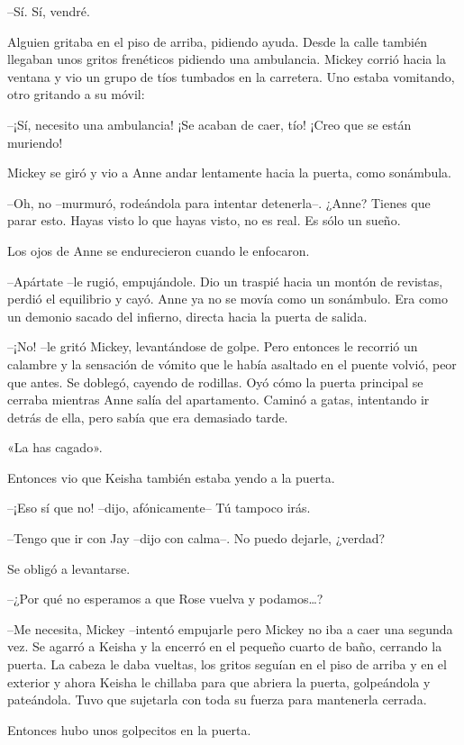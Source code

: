 {--Sí. Sí, vendré.}

{Alguien gritaba en el piso de arriba, pidiendo ayuda. Desde la calle
 también llegaban unos gritos frenéticos pidiendo una ambulancia. Mickey
 corrió hacia la ventana y vio un grupo de tíos tumbados en la carretera.
Uno estaba vomitando, otro gritando a su móvil:}

{--¡Sí, necesito una ambulancia! ¡Se acaban de caer, tío! ¡Creo que se
están muriendo!}

{Mickey se giró y vio a Anne andar lentamente hacia la puerta, como
sonámbula.}

{--Oh, no --murmuró, rodeándola para intentar detenerla--. ¿Anne? Tienes
 que parar esto. Hayas visto lo que hayas visto, no es real. Es sólo un
sueño.}

{Los ojos de Anne se endurecieron cuando le enfocaron.}

{--Apártate --le rugió, empujándole. Dio un traspié hacia un montón de
 revistas, perdió el equilibrio y cayó. Anne ya no se movía como un
 sonámbulo. Era como un demonio sacado del infierno, directa hacia la
puerta de salida.}

{--¡No! --le gritó Mickey, levantándose de golpe. Pero entonces le
 recorrió un calambre y la sensación de vómito que le había asaltado en
 el puente volvió, peor que antes. Se doblegó, cayendo de rodillas. Oyó
 cómo la puerta principal se cerraba mientras Anne salía del apartamento.
 Caminó a gatas, intentando ir detrás de ella, pero sabía que era
demasiado tarde.}

{«La has cagado».}

{Entonces vio que Keisha también estaba yendo a la puerta.}

{--¡Eso sí que no! --dijo, afónicamente-- Tú tampoco irás.}

{--Tengo que ir con Jay --dijo con calma--. No puedo dejarle, ¿verdad?}

{Se obligó a levantarse.}

{--¿Por qué no esperamos a que Rose vuelva y podamos\ldots{}?}

{--Me necesita, Mickey --intentó empujarle pero Mickey no iba a caer una
 segunda vez. Se agarró a Keisha y la encerró en el pequeño cuarto de
 baño, cerrando la puerta. La cabeza le daba vueltas, los gritos seguían
 en el piso de arriba y en el exterior y ahora Keisha le chillaba para
 que abriera la puerta, golpeándola y pateándola. Tuvo que sujetarla con
toda su fuerza para mantenerla cerrada.}

{Entonces hubo unos golpecitos en la puerta.}

